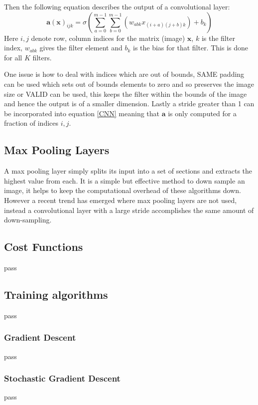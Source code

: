   Then the following equation describes the output of a convolutional layer:
  \begin{equation} \label{CNN}
    \mathbf{a}(\mathbf{x})_{ijk} = \sigma \left ( \sum_{a=0}^{m-1}\sum_{b=0}^{m-1}(w_{abk}x_{(i+a)(j+b)k}) + b_k \right )
  \end{equation}
  Here $i,j$  denote row, column indices for the matrix (image) $\mathbf{x}$, $k$ is the filter index, $w_{abk}$
  gives the filter element and $b_k$ is the bias for that filter. This is done for all $K$ filters.

  One issue is how to deal with indices which are out of bounds, SAME padding can be used which sets out of bounds
  elements to zero and so preserves the image size or VALID can be used, this keeps the filter within the bounds of the
  image and hence the output is of a smaller dimension. Lastly a stride greater than 1 can be incorporated into equation
  \ref{CNN} meaning that $\mathbf{a}$ is only computed for a fraction of indices $i,j$.
  \subsection{Max Pooling Layers}
  A max pooling layer simply splits its input into a set of sections and extracts
  the highest value from each. It is a simple but effective method to down sample
  an image, it helps to keep the computational overhead of these algorithms
  down. However a recent trend \cite{Springenberg2015} has emerged where max pooling
  layers are not used, instead a convolutional layer with a large stride accomplishes
  the same amount of down-sampling.
    \subsection{Cost Functions}
      pass
    \subsection{Training algorithms}
      pass
      \subsubsection{Gradient Descent}
        pass
      \subsubsection{Stochastic Gradient Descent}
        pass
